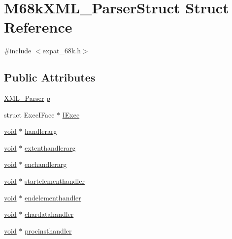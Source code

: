 \hypertarget{struct_m68k_x_m_l___parser_struct}{}\section{M68k\+X\+M\+L\+\_\+\+Parser\+Struct Struct Reference}
\label{struct_m68k_x_m_l___parser_struct}


{\ttfamily \#include $<$expat\+\_\+68k.\+h$>$}

\subsection*{Public Attributes}
\begin{DoxyCompactItemize}
\item 
\hyperlink{amiga_2include_2libraries_2expat_8h_a9dc0003156857c67b3a60b3993846013}{X\+M\+L\+\_\+\+Parser} \hyperlink{struct_m68k_x_m_l___parser_struct_aeb6edc51a1dba19c54dd3477b8b1051b}{p}
\item 
struct Exec\+I\+Face $\ast$ \hyperlink{struct_m68k_x_m_l___parser_struct_ac80c7fa7cae52f9ab31d910e270fc5e3}{I\+Exec}
\item 
\hyperlink{sound_8c_ae35f5844602719cf66324f4de2a658b3}{void} $\ast$ \hyperlink{struct_m68k_x_m_l___parser_struct_a734705c893df14f7cb81e761db8a079a}{handlerarg}
\item 
\hyperlink{sound_8c_ae35f5844602719cf66324f4de2a658b3}{void} $\ast$ \hyperlink{struct_m68k_x_m_l___parser_struct_a97f2ba975e1a79d83aaa4a2f80d1a022}{extenthandlerarg}
\item 
\hyperlink{sound_8c_ae35f5844602719cf66324f4de2a658b3}{void} $\ast$ \hyperlink{struct_m68k_x_m_l___parser_struct_a210dce6b24d1063b6b974cc3d4d345b7}{enchandlerarg}
\item 
\hyperlink{sound_8c_ae35f5844602719cf66324f4de2a658b3}{void} $\ast$ \hyperlink{struct_m68k_x_m_l___parser_struct_aaa1a6d24064b43ed8d6ee5d81e8c7531}{startelementhandler}
\item 
\hyperlink{sound_8c_ae35f5844602719cf66324f4de2a658b3}{void} $\ast$ \hyperlink{struct_m68k_x_m_l___parser_struct_a00fe1971c9a92b7cfddd4d54bbdf2e8d}{endelementhandler}
\item 
\hyperlink{sound_8c_ae35f5844602719cf66324f4de2a658b3}{void} $\ast$ \hyperlink{struct_m68k_x_m_l___parser_struct_a8abe10bfdc838cda43dcb57b7759121f}{chardatahandler}
\item 
\hyperlink{sound_8c_ae35f5844602719cf66324f4de2a658b3}{void} $\ast$ \hyperlink{struct_m68k_x_m_l___parser_struct_aa2784c873f2064a133bc1961061418af}{procinsthandler}

\end{DoxyCompactItemize}

